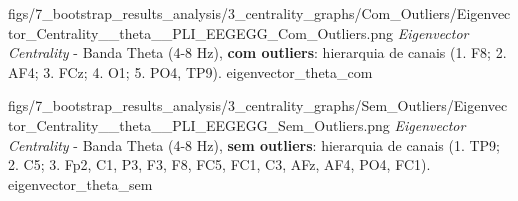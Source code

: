 
\ultrawidefigure
{figs/7_bootstrap_results_analysis/3_centrality_graphs/Com_Outliers/Eigenvector_Centrality__theta__PLI_EEGEGG_Com_Outliers.png}
{\textit{Eigenvector Centrality} - Banda Theta (4-8 Hz), \textbf{com outliers}: hierarquia de canais (1. F8; 2. AF4; 3. FCz; 4. O1; 5. PO4, TP9).}
{eigenvector_theta_com}

\ultrawidefigure
{figs/7_bootstrap_results_analysis/3_centrality_graphs/Sem_Outliers/Eigenvector_Centrality__theta__PLI_EEGEGG_Sem_Outliers.png}
{\textit{Eigenvector Centrality} - Banda Theta (4-8 Hz), \textbf{sem outliers}: hierarquia de canais (1. TP9; 2. C5; 3. Fp2, C1, P3, F3, F8, FC5, FC1, C3, AFz, AF4, PO4, FC1).}
{eigenvector_theta_sem}